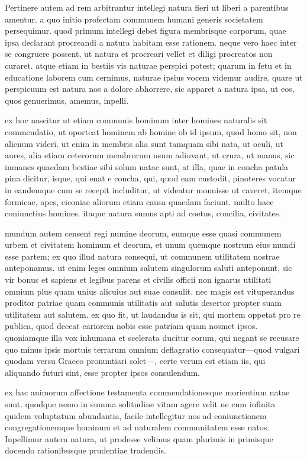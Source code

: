 Pertinere autem ad rem arbitrantur intellegi natura fieri ut liberi a parentibus amentur. a quo initio profectam communem humani generis societatem persequimur. quod primum intellegi debet figura membrisque corporum, quae ipsa declarant procreandi a natura habitam esse rationem. neque vero haec inter se congruere possent, ut natura et procreari vellet et diligi procreatos non curaret. atque etiam in bestiis vis naturae perspici potest; quarum in fetu et in educatione laborem cum cernimus, naturae ipsius vocem videmur audire. quare ut perspicuum est natura nos a dolore abhorrere, sic apparet a natura ipsa, ut eos, quos genuerimus, amemus, inpelli.

 ex hoc nascitur ut etiam communis hominum inter homines naturalis sit commendatio, ut oporteat hominem ab homine ob id ipsum, quod homo sit, non alienum videri. ut enim in membris alia sunt tamquam sibi nata, ut oculi, ut aures, alia etiam ceterorum membrorum usum adiuvant, ut crura, ut manus, sic inmanes quaedam bestiae sibi solum natae sunt, at illa, quae in concha patula pina dicitur, isque, qui enat e concha, qui, quod eam custodit, pinoteres vocatur in eandemque cum se recepit includitur, ut videatur monuisse ut caveret, itemque formicae, apes, ciconiae aliorum etiam causa quaedam faciunt. multo haec coniunctius homines. itaque natura sumus apti ad coetus, concilia, civitates.

 mundum autem censent regi numine deorum, eumque esse quasi communem urbem et civitatem hominum et deorum, et unum quemque nostrum eius mundi esse partem; ex quo illud natura consequi, ut communem utilitatem nostrae anteponamus. ut enim leges omnium salutem singulorum saluti anteponunt, sic vir bonus et sapiens et legibus parens et civilis officii non ignarus utilitati omnium plus quam unius alicuius aut suae consulit. nec magis est vituperandus proditor patriae quam communis utilitatis aut salutis desertor propter suam utilitatem aut salutem. ex quo fit, ut laudandus is sit, qui mortem oppetat pro re publica, quod deceat cariorem nobis esse patriam quam nosmet ipsos. quoniamque illa vox inhumana et scelerata ducitur eorum, qui negant se recusare quo minus ipsis mortuis terrarum omnium deflagratio consequatur—quod vulgari quodam versu Graeco pronuntiari solet—, certe verum est etiam iis, qui aliquando futuri sint, esse propter ipsos consulendum.

 ex hac animorum affectione testamenta commendationesque morientium natae sunt. quodque nemo in summa solitudine vitam agere velit ne cum infinita quidem voluptatum abundantia, facile intellegitur nos ad coniunctionem congregationemque hominum et ad naturalem communitatem esse natos. Inpellimur autem natura, ut prodesse velimus quam plurimis in primisque docendo rationibusque prudentiae tradendis.

